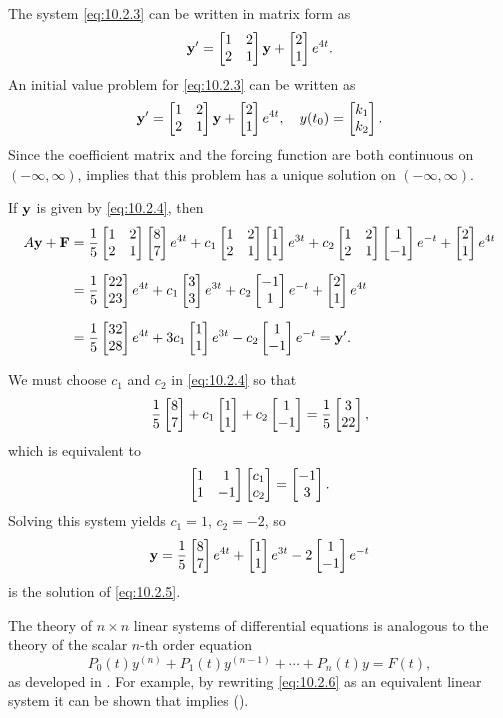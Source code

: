 \begin{alistSolution}
\item
The system  \eqref{eq:10.2.3} can be written in matrix form as
\[
\mathbf{y}'=\begin{bmatrix}1&2\\2&1\end{bmatrix}\mathbf{y}+\begin{bmatrix}2\\1\end{bmatrix}e^{4t}.
\]
An initial value problem for \eqref{eq:10.2.3} can be written as
\[
\mathbf{y}'=\begin{bmatrix}1&2\\2&1\end{bmatrix}\mathbf{y}+\begin{bmatrix}2\\1\end{bmatrix}e^{4t}, \quad
y(t_0)=\begin{bmatrix}k_1\\k_2\end{bmatrix}.
\]
Since the coefficient matrix and the forcing function are both
continuous on $(-\infty,\infty)$,  implies that
this problem has a unique solution on $(-\infty,\infty)$.

\item
If $\mathbf{y}$ is given by \eqref{eq:10.2.4}, then
\begin{align*}
A\mathbf{y}+\mathbf{F}&=
\frac{1}{5}\begin{bmatrix}1&2\\2&1\end{bmatrix}\begin{bmatrix}8\\7\end{bmatrix}e^{4t}+
c_1\begin{bmatrix}1&2\\2&1\end{bmatrix}\begin{bmatrix}1\\1\end{bmatrix}e^{3t}
+c_2\begin{bmatrix}1&2\\2&1\end{bmatrix}\begin{bmatrix}1\\-1\end{bmatrix}e^{-t}
+\begin{bmatrix}2\\1\end{bmatrix}e^{4t}\\[2\jot]
&=\frac{1}{5}\begin{bmatrix}22\\23\end{bmatrix}e^{4t}+c_1\begin{bmatrix}3\\3\end{bmatrix}e^{3t}+c_2\begin{bmatrix}-1\\1\end{bmatrix}e^{-t}
+\begin{bmatrix}2\\1\end{bmatrix}e^{4t}\\[2\jot]
&=\frac{1}{5}\begin{bmatrix}32\\28\end{bmatrix}e^{4t}+3c_1\begin{bmatrix}1\\1\end{bmatrix}e^{3t}-c_2\begin{bmatrix}1\\-1\end{bmatrix}e^{-t}
=\mathbf{y}'.
\end{align*}

\item
We must choose $c_1$ and $c_2$ in \eqref{eq:10.2.4} so that
\[
\frac{1}{5}\begin{bmatrix}8\\7\end{bmatrix}+c_1\begin{bmatrix}1\\1\end{bmatrix}+c_2\begin{bmatrix}1\\-1\end{bmatrix}=\frac{1}{5}\begin{bmatrix}3\\22\end{bmatrix},
\]
which is equivalent to
\[
\begin{bmatrix}1&1\\1&-1\end{bmatrix}\begin{bmatrix}c_1\\c_2\end{bmatrix}=\begin{bmatrix}-1\\3\end{bmatrix}.
\]
Solving this system yields $c_1=1$, $c_2=-2$, so
\[
\mathbf{y}=\frac{1}{5}\begin{bmatrix}8\\7\end{bmatrix}e^{4t}+\begin{bmatrix}1\\1\end{bmatrix}e^{3t}-2\begin{bmatrix}1\\-1\end{bmatrix}e^{-t}
\]
is the solution of  \eqref{eq:10.2.5}.
\end{alistSolution}

\begin{remark*}
The theory of $n\times n$ linear systems of differential
equations is analogous to the theory of the scalar $n$-th order
equation
\begin{equation} \label{eq:10.2.6}
P_0(t)y^{(n)}+P_1(t)y^{(n-1)}+\cdots+P_n(t)y=F(t),
\end{equation}
as
developed in . For example, by rewriting
\eqref{eq:10.2.6} as an equivalent linear system it can be shown that
 implies 
().
\end{remark*}

\exercises

